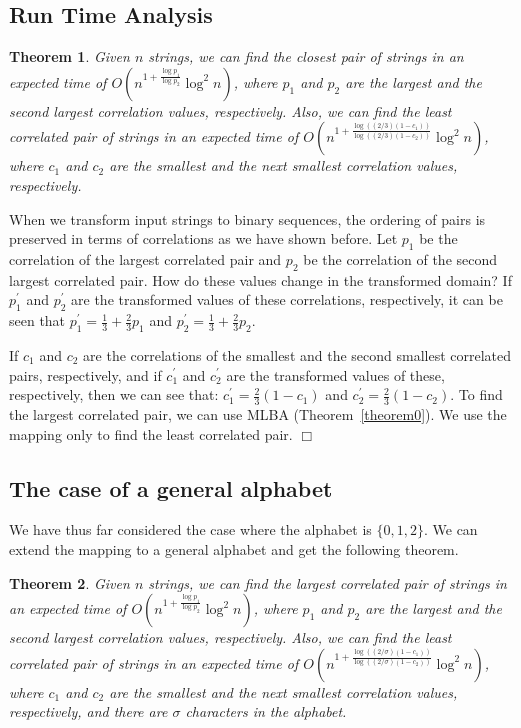 \documentclass{article}
\newtheorem{theorem}{Theorem}[section]
\theoremstyle{definition}
\theoremstyle{remark}
\begin{document}
 \subsection{Run Time Analysis}\label{mapanalysis}
\begin{theorem}\label{theorem1}
 Given $n$ strings, we can find the closest pair of strings in an expected time of $O\left (n^{1+\frac{\log p_1}{\log p_2}}\log^2n\right )$, where $p_1$ and $p_2$ are the largest and the second largest correlation values, respectively. Also, we can find the least correlated pair of strings in an expected time of \protect\linebreak $O\left (n^{1+\frac{\log ((2/3)(1-c_1))}{\log ((2/3)(1-c_2))}}\log^2n\right )$, where $c_1$ and $c_2$ are the smallest and the next smallest correlation values, respectively.
 \end{theorem}

 When we transform input strings to binary sequences, the ordering of pairs is preserved in terms of correlations as we have shown before. Let $p_1$ be the correlation of the largest correlated pair and $p_2$ be the correlation of the second largest correlated pair. How do these values change in the transformed domain? If $p_1^\prime$ and $p_2^\prime$ are the transformed values of these correlations, respectively, it can be seen that $p_1^\prime=\frac{1}{3}+\frac{2}{3}p_1$ and $p_2^\prime=\frac{1}{3}+\frac{2}{3}p_2$.

 If $c_1$ and $c_2$ are the correlations of the smallest and the second smallest correlated pairs, respectively, and if $c_1^\prime$ and $c_2^\prime$ are the transformed values of these, respectively, then we can see that: $c_1^\prime=\frac{2}{3}(1-c_1)$ and $c_2^\prime=\frac{2}{3}(1-c_2)$. To find the largest correlated pair, we can use MLBA (Theorem~\ref{theorem0}). We use the mapping only to find the least correlated pair. $\Box$

 \subsection{The case of a general alphabet}
 We have thus far considered the case where the alphabet is $\{0,1,2\}$. We can extend the mapping to a general alphabet and get the following theorem.

\begin{theorem}
 Given $n$ strings, we can find the largest correlated pair of strings in an expected time of  \newline $O\left (n^{1+\frac{\log p_1}{\log p_2}}\log^2n\right )$, where $p_1$ and $p_2$ are the largest and the second largest correlation values, respectively. Also, we can find the least correlated pair of strings in an expected  time of \protect\linebreak $O\left (n^{1+\frac{\log ((2/\sigma)(1-c_1))}{\log ((2/\sigma)(1-c_2))}}\log^2n\right )$, where $c_1$ and $c_2$ are the smallest and the next smallest correlation values, respectively, and there are $\sigma$ characters in the alphabet.
 \end{theorem}
\end{document}
